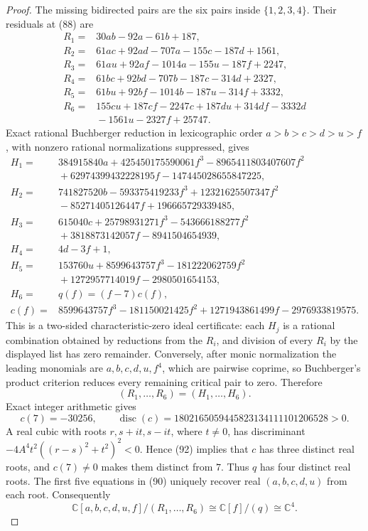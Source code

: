 \documentclass{article}
\begin{document}
\begin{proof}
The missing bidirected pairs are the six pairs inside \(\{1,2,3,4\}\).  Their residuals at (88) are
\[
\begin{aligned}
 R_1={}&30ab-92a-61b+187,\\
 R_2={}&61ac+92ad-707a-155c-187d+1561,\\
 R_3={}&61au+92af-1014a-155u-187f+2247,\\
 R_4={}&61bc+92bd-707b-187c-314d+2327,\\
 R_5={}&61bu+92bf-1014b-187u-314f+3332,\\
 R_6={}&155cu+187cf-2247c+187du+314df-3332d\\
 &{}-1561u-2327f+25747.
\end{aligned}
\tag{89}
\]
Exact rational Buchberger reduction in lexicographic order \(a>b>c>d>u>f\), with nonzero rational normalizations suppressed, gives
\[
\begin{aligned}
 H_1={}&384915840a+425450175590061f^3-8965411803407607f^2\\
 &{}+62974399432228195f-147445028655847225,\\
 H_2={}&741827520b-593375419233f^3+12321625507347f^2\\
 &{}-85271405126447f+196665729339485,\\
 H_3={}&615040c+25798931271f^3-543666188277f^2\\
 &{}+3818873142057f-8941504654939,\\
 H_4={}&4d-3f+1,\\
 H_5={}&153760u+8599643757f^3-181222062759f^2\\
 &{}+1272957714019f-2980501654153,\\
 H_6={}&q(f)=(f-7)c(f),\\
 c(f)={}&8599643757f^3-181150021425f^2
 +1271943861499f-2976933819575.
\end{aligned}
\tag{90}
\]
This is a two-sided characteristic-zero ideal certificate: each \(H_j\) is a rational combination obtained by reductions from the \(R_i\), and division of every \(R_i\) by the displayed list has zero remainder.  Conversely, after monic normalization the leading monomials are \(a,b,c,d,u,f^4\), which are pairwise coprime, so Buchberger's product criterion reduces every remaining critical pair to zero.  Therefore
\[
 (R_1,\ldots,R_6)=(H_1,\ldots,H_6).
\tag{91}
\]
Exact integer arithmetic gives
\[
 c(7)=-30256,
 \qquad
 \operatorname{disc}(c)
 =1802165059445823134111101206528>0.
\tag{92}
\]
A real cubic with roots \(r,s+it,s-it\), where \(t\ne0\), has discriminant \(-4A^4t^2((r-s)^2+t^2)^2<0\).  Hence (92) implies that \(c\) has three distinct real roots, and \(c(7)\ne0\) makes them distinct from \(7\).  Thus \(q\) has four distinct real roots.  The first five equations in (90) uniquely recover real \((a,b,c,d,u)\) from each root.  Consequently
\[
 \mathbb C[a,b,c,d,u,f]/(R_1,\ldots,R_6)
 \cong\mathbb C[f]/(q)\cong\mathbb C^4.
\tag{93}
\]


\end{proof}
\end{document}

